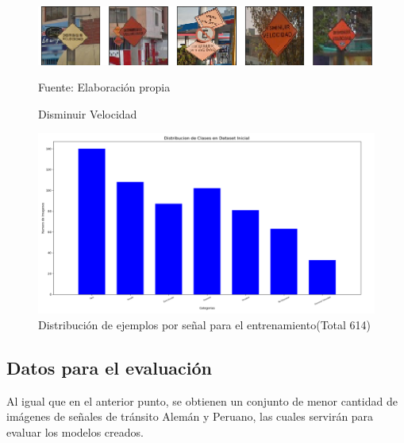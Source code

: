 			\begin{figure}[H]
				\begin{center}
				\includegraphics[width=1\textwidth]{images/desarrollo/imagenes/peru/1__(7).png}
				\end{center}
				\begin{center}
				\caption{\small{Disminuir Velocidad}}
				\vskip -0.25cm
				{\small{Fuente: Elaboración propia}}
				\end{center}
				\vspace{-1.5em}
			\end{figure}
			\vskip 2cm
			\begin{figure}[H]
				\begin{center}
				\includegraphics[width=1\textwidth]{images/desarrollo/histograms/inicioTrain614}
				\end{center}
				\begin{center}
				\caption{\small{Distribución de ejemplos por señal para el entrenamiento(Total 614)}}
				{\small{\fontsize{10}{16.8}\selectfont {Fuente: Elaboración propia}}}
				\end{center}
				\vspace{-1.5em}
			\end{figure}

			

	\subsection{Datos para el evaluación}
		Al igual que en el anterior punto, se obtienen un conjunto de menor cantidad de imágenes de señales de tránsito Alemán y Peruano, las cuales servirán para evaluar los modelos creados.

